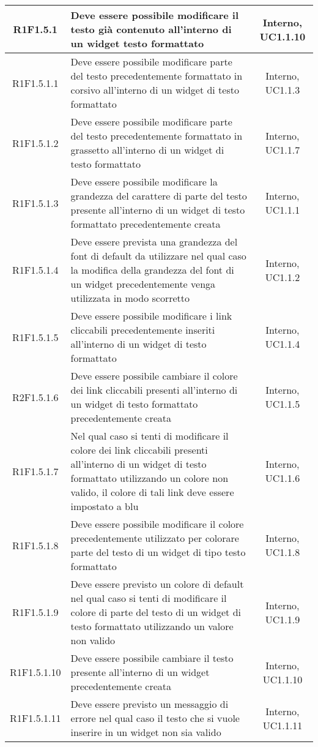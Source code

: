 \begin{longtable}{|c|>{\centering}m{7cm}|c|}
			\hline
		R1F1.5.1 & Deve essere possibile modificare il testo già contenuto all'interno di un widget testo formattato & Interno, UC1.1.10 \\
		\hline
		R1F1.5.1.1 & Deve essere possibile modificare parte del testo precedentemente formattato in corsivo all'interno di un widget di testo formattato & Interno, UC1.1.3 \\
		\hline
		R1F1.5.1.2 & Deve essere possibile modificare parte del testo precedentemente formattato in grassetto all'interno di un widget di testo formattato & Interno, UC1.1.7 \\
		\hline
		R1F1.5.1.3 & Deve essere possibile modificare la grandezza del carattere di parte del testo presente all'interno di un widget di testo formattato precedentemente creata & Interno, UC1.1.1\\
		\hline
		R1F1.5.1.4 & Deve essere prevista una grandezza del font di default da utilizzare nel qual caso la modifica della grandezza del font di un widget precedentemente venga utilizzata in modo scorretto & Interno, UC1.1.2 \\
		\hline
		R1F1.5.1.5 & Deve essere possibile modificare i link cliccabili precedentemente inseriti all'interno di un widget di testo formattato & Interno, UC1.1.4 \\
		\hline
		R2F1.5.1.6 & Deve essere possibile cambiare il colore dei link cliccabili presenti all'interno di un widget di testo formattato precedentemente creata & Interno, UC1.1.5 \\
		\hline
		R1F1.5.1.7 & Nel qual caso si tenti di modificare il colore dei link cliccabili presenti all'interno di un widget di testo formattato utilizzando un colore non valido, il colore di tali link deve essere impostato a blu & Interno, UC1.1.6 \\
		\hline
		R1F1.5.1.8 & Deve essere possibile modificare il colore precedentemente utilizzato per colorare parte del testo di un widget di tipo testo formattato & Interno, UC1.1.8 \\
		\hline
		R1F1.5.1.9 & Deve essere previsto un colore di default nel qual caso si tenti di modificare il colore di parte del testo di un widget di testo formattato utilizzando un valore non valido & Interno, UC1.1.9 \\
		\hline
		R1F1.5.1.10 & Deve essere possibile cambiare il testo presente all'interno di un widget precedentemente creata & Interno, UC1.1.10 \\
		\hline
		R1F1.5.1.11 & Deve essere previsto un messaggio di errore nel qual caso il testo che si vuole inserire in un widget non sia valido & Interno, UC1.1.11 \\

\end{longtable}
